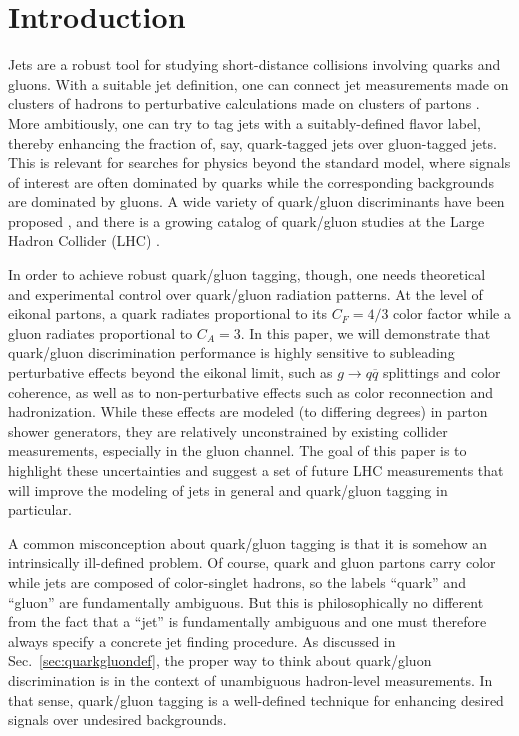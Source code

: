 \documentclass[11pt,letterpaper]{article}
\DeclareRobustCommand{\Sec}[1]{Sec.~\ref{#1}}
\begin{document}
\section{Introduction}
\label{introduction}

Jets are a robust tool for studying short-distance collisions involving quarks and gluons.  With a suitable jet definition, one can connect jet measurements made on clusters of hadrons to perturbative calculations made on clusters of partons \cite{}.  More ambitiously, one can try to tag jets with a suitably-defined flavor label, thereby enhancing the fraction of, say, quark-tagged jets over gluon-tagged jets.  This is relevant for searches for physics beyond the standard model, where signals of interest are often dominated by quarks while the corresponding backgrounds are dominated by gluons.  A wide variety of quark/gluon discriminants have been proposed \cite{}, and there is a growing catalog of quark/gluon studies at the Large Hadron Collider (LHC) \cite{}.

In order to achieve robust quark/gluon tagging, though, one needs theoretical and experimental control over quark/gluon radiation patterns.  At the level of eikonal partons, a quark radiates proportional to its $C_F = 4/3$ color factor while a gluon radiates proportional to $C_A = 3$.  In this paper, we will demonstrate that quark/gluon discrimination performance is highly sensitive to subleading perturbative effects beyond the eikonal limit, such as $g \to q \overline{q}$ splittings and color coherence, as well as to non-perturbative effects such as color reconnection and hadronization.   While these effects are modeled (to differing degrees) in parton shower generators, they are relatively unconstrained by existing collider measurements, especially in the gluon channel.  The goal of this paper is to highlight these uncertainties and suggest a set of future LHC measurements that will improve the modeling of jets in general and quark/gluon tagging in particular.

A common misconception about quark/gluon tagging is that it is somehow an intrinsically ill-defined problem.  Of course, quark and gluon partons carry color while jets are composed of color-singlet hadrons, so the labels ``quark'' and ``gluon'' are fundamentally ambiguous.  But this is philosophically no different from the fact that a ``jet'' is fundamentally ambiguous and one must therefore always specify a concrete jet finding procedure.  As discussed in \Sec{sec:quarkgluondef}, the proper way to think about quark/gluon discrimination is in the context of unambiguous hadron-level measurements.  In that sense, quark/gluon tagging is a well-defined technique for enhancing desired signals over undesired backgrounds.
\end{document}
